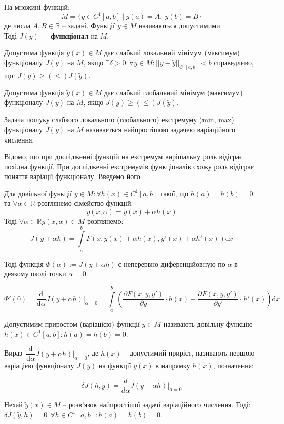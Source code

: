 \documentclass[14pt,a4paper]{scrartcl}
\theoremstyle{definition}
\theoremstyle{definition}
\theoremstyle{definition}
\begin{document}
На множині функцій:
$$M = \{ y \in C^1[a, b] \  | \  y(a) = A, \ y(b) = B\}$$
 де числа $A, B \in \mathbb{R}$ -- задані. Функції $y \in M$ називаються допустимими. \\
 Тоді $J(y)$ --- \textbf{функціонал} на $M$.

 Допустима функція $\tilde{y}(x) \in M$ дає слабкий локальний мінімум (максимум) функціоналу $J(y)$ на $M$, якщо $\exists \delta > 0 : \forall y \in M :|| y - \tilde{y}||_{C^1[a,b]} < b$ справедливо, що: $J(y) \geq (\leq) J(\tilde{y})$.

 Допустима функція $\tilde{y}(x) \in M$ дає слабкий глобальний мінімум (максимум) функціоналу $J(y)$ на $M$, якщо  $J(y) \geq (\leq) J(\tilde{y})$.

 Задача пошуку слабкого локального (глобального) екстремуму (min, max) функціоналу $J(y)$ на $M$ називається найпростішою задачею варіаційного числення.

Відомо, що при дослідженні функцій на екстремум вирішальну роль відіграє похідна функції. При дослідженні екстремумів функціоналів схожу роль відіграє поняття варіації функціоналу. Введемо його.

Для довільної функції $y \in M : \forall h(x) \in C^1[a, b]$ такої, що $h(a) = h(b) = 0$ та $\forall \alpha \in \mathbb{R}$ розглянемо сімейство функцій: $$y(x, \alpha) = y(x) + \alpha h(x)$$
Тоді $\forall \alpha \in \mathbb{R} y(x, \alpha) \in M$ розглянемо: $$ J(y + \alpha h) = \int\limits_{a}^{b} F(x, y(x) + \alpha h(x), y'(x) + \alpha h'(x)) \mathrm{d}x$$

Тоді функція $\Phi(\alpha) := J(y + \alpha h)$ є неперервно-диференційовную по $\alpha$ в деякому околі точки $\alpha = 0$.

$$\Phi'(0) = \dfrac{\mathrm{d}}{\mathrm{d}\alpha}J(y + \alpha h)\Big|_{\alpha = 0} = \int\limits_{a}^{b}\left(\dfrac{\partial F(x, y, y')}{\partial y} \cdot h(x) + \dfrac{\partial F(x, y, y')}{\partial y'} \cdot h'(x)\right)\mathrm{d}x$$

 Допустимим приростом (варіацією) функції $y \in M$ називають довільну функцію $h(x) \in C^1[a, b] : h(a) = h(b) = 0$.

Вираз $\ \dfrac{\mathrm{d}}{\mathrm{d}\alpha} J(y + \alpha h)\Big|_{\alpha = 0}$, де $h(x)$ -- допустимий приріст, називають першою варіацією функціоналу $J(y)$ на функції $y(x)$ в напрямку $h(x)$, позначення:

$$ \delta J(h, y) =  \dfrac{d}{d\alpha} J(y + \alpha h)\Big|_{\alpha = 0}$$

\begin{boxteo}
  Нехай $\tilde{y}(x) \in M$ --  розв'язок найпростішої задачі варіаційного числення. Тоді:
  $\delta J(\tilde{y}, h) = 0 \ \ \forall h \in C^1[a, b] : h(a) = h(b) = 0$.
\end{boxteo}
\end{document}
